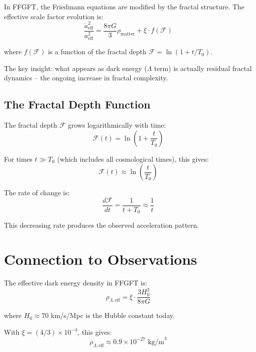 In FFGFT, the Friedmann equations are modified by the fractal structure. The effective scale factor evolution is:
\begin{equation}
\frac{\dot{a}_{\text{eff}}^2}{a_{\text{eff}}^2} = \frac{8\pi G}{3}\rho_{\text{matter}} + \xi \cdot f(\mathcal{F})
\end{equation}

where $f(\mathcal{F})$ is a function of the fractal depth $\mathcal{F} = \ln(1 + t/T_0)$.

The key insight: what appears as dark energy ($\Lambda$ term) is actually residual fractal dynamics -- the ongoing increase in fractal complexity.

\subsection{The Fractal Depth Function}

The fractal depth $\mathcal{F}$ grows logarithmically with time:
\begin{equation}
\mathcal{F}(t) = \ln\left(1 + \frac{t}{T_0}\right)
\end{equation}

For times $t \gg T_0$ (which includes all cosmological times), this gives:
\begin{equation}
\mathcal{F}(t) \approx \ln\left(\frac{t}{T_0}\right)
\end{equation}

The rate of change is:
\begin{equation}
\frac{d\mathcal{F}}{dt} = \frac{1}{t + T_0} \approx \frac{1}{t}
\end{equation}

This decreasing rate produces the observed acceleration pattern.

\section{Connection to Observations}

The effective dark energy density in FFGFT is:
\begin{equation}
\rho_{\Lambda,\text{eff}} = \xi \cdot \frac{3H_0^2}{8\pi G}
\end{equation}

where $H_0 \approx 70$ km/s/Mpc is the Hubble constant today.

With $\xi = (4/3) \times 10^{-4}$, this gives:
\begin{equation}
\rho_{\Lambda,\text{eff}} \approx 0.9 \times 10^{-27} \text{ kg/m}^3
\end{equation}

